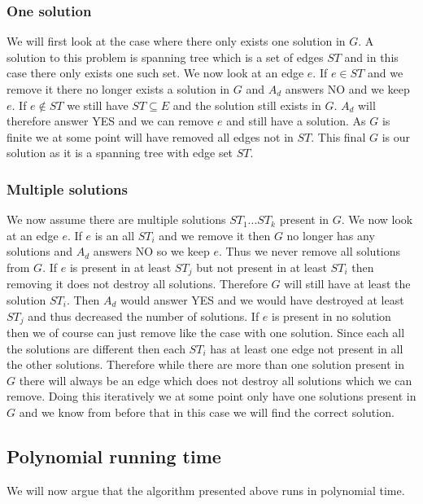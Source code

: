 \subsubsection*{One solution}
We will first look at the case where there only exists one solution in $G$. A solution to this problem is spanning tree which is a set of edges $ST$ and in this case there only exists one such set. We now look at an edge $e$. If $e\in ST$ and we remove it there no longer exists a solution in $G$ and $A_d$ answers NO and we keep $e$. If $e\notin ST$ we still have $ST \subseteq E$ and the solution still exists in $G$. $A_d$ will therefore answer YES and we can remove $e$ and still have a solution. As $G$ is finite we at some point will have removed all edges not in $ST$. This final $G$ is our solution as it is a spanning tree with edge set $ST$.

\subsubsection*{Multiple solutions}
We now assume there are multiple solutions $ST_1\dots ST_k$ present in $G$. We now look at an edge $e$. If $e$ is an all $ST_i$ and we remove it then $G$ no longer has any solutions and $A_d$ answers NO so we keep $e$. Thus we never remove all solutions from $G$. If $e$ is present in at least $ST_j$ but not present in at least $ST_i$ then removing it does not destroy all solutions. Therefore $G$ will still have at least the solution $ST_i$. Then $A_d$ would answer YES and we would have destroyed at least $ST_j$ and thus decreased the number of solutions. If $e$ is present in no solution then we of course can just remove like the case with one solution. Since each all the solutions are different then each $ST_i$ has at least one edge not present in all the other solutions. Therefore while there are more than one solution present in $G$ there will always be an edge which does not destroy all solutions which we can remove. Doing this iteratively we at some point only have one solutions present in $G$ and we know from before that in this case we will find the correct solution.

\subsection*{Polynomial running time}
We will now argue that the algorithm presented above runs in polynomial time. 

